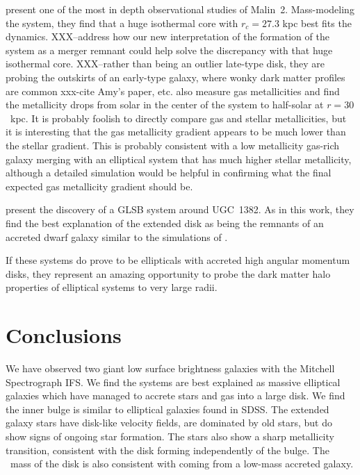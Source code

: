 \documentclass[12pt,preprint]{aastex}
\newcommand\HI{\ion{H}{1}}
\begin{document}
\citet{Kasparova14} present one of the most in depth observational studies of Malin~2.
Mass-modeling the system, they find that a huge isothermal core with $r_c=27.3$ kpc best fits the dynamics.
XXX--address how our new interpretation of the formation of the system as a merger remnant could help solve the discrepancy with that huge isothermal core. 
XXX--rather than being an outlier late-type disk, they are probing the outskirts of an early-type galaxy, where wonky dark matter profiles are common xxx-cite Amy's paper, etc.
\citet{Kasparova14} also measure gas metallicities and find the metallicity drops from solar in the center of the system to half-solar at $r=30$\ kpc.
It is probably foolish to directly compare gas and stellar metallicities, but it is interesting that the gas metallicity gradient appears to be much lower than the stellar gradient.
This is probably consistent with a low metallicity gas-rich galaxy merging with an elliptical system that has much higher stellar metallicity, although a detailed simulation would be helpful in confirming what the final expected gas metallicity gradient should be.


\citet{Hagen16} present the discovery of a GLSB system around UGC~1382.
As in this work, they find the best explanation of the extended disk as being the remnants of an accreted dwarf galaxy similar to the simulations of \citet{Pen06}. 

If these systems do prove to be ellipticals with accreted high angular momentum disks, they represent an amazing opportunity to probe the dark matter halo properties of elliptical systems to very large radii. 


\section{Conclusions}\label{sec:conclusions}

We have observed two giant low surface brightness galaxies with the Mitchell Spectrograph IFS.
We find the systems are best explained as massive elliptical galaxies which have managed to accrete stars and gas into a large disk.
We find the inner bulge is similar to elliptical galaxies found in SDSS.
The extended galaxy stars have disk-like velocity fields, are dominated by old stars, but do show signs of ongoing star formation. The stars also show a sharp metallicity transition, consistent with the disk forming independently of the bulge. The \HI\ mass of the disk is also consistent with coming from a low-mass accreted galaxy.
\end{document}
